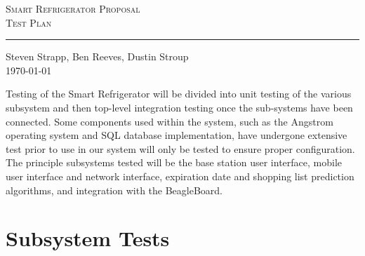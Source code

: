 \documentclass[11pt,letterpaper]{article}
\begin{document}
\begin{center}
\huge
\textsc{Smart Refrigerator Proposal}\\
\Large
\textsc{Test Plan} \\
\vspace{.20cm}
\hrule
\vspace{.40cm}
\normalsize
Steven Strapp, Ben Reeves, Dustin Stroup \\
\today \\
\vspace{1cm}
\end{center}
Testing of the Smart Refrigerator will be divided into unit testing of the various subsystem and then top-level integration testing once the sub-systems have been connected. Some components used within the system, such as the Angstrom operating system and SQL database implementation, have undergone extensive test prior to use in our system will only be tested to ensure proper configuration. The principle subsystems tested will be the base station user interface, mobile user interface and network interface, expiration date and shopping list prediction algorithms, and integration with the BeagleBoard.

\section{Subsystem Tests}
\end{document}
